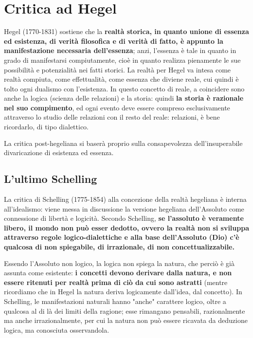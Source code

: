 \chapter{Critica ad Hegel}
\bigskip


Hegel (1770-1831) sostiene che la \textbf{realtà storica, in quanto unione di essenza ed esistenza, di verità filosofica e di verità di fatto, è appunto la manifestazione necessaria dell'essenza}; anzi, l'essenza è tale in quanto in grado di manifestarsi compiutamente, cioè in quanto realizza pienamente le sue possibilità e potenzialità nei fatti storici. La realtà per Hegel va intesa come realtà compiuta, come effettualità, come essenza che diviene reale, cui quindi è tolto ogni dualismo con l'esistenza. In questo concetto di reale, a coincidere sono anche la logica (scienza delle relazioni) e la storia: quindi \textbf{la storia è razionale nel suo compimento}, ed ogni evento deve essere compreso esclusivamente attraverso lo studio delle relazioni con il resto del reale: relazioni, è bene ricordarlo,  di tipo dialettico.

La critica post-hegeliana si baserà proprio sulla consapevolezza dell'insuperabile divaricazione di esistenza ed essenza.

\section{L'ultimo Schelling}

La critica di Schelling (1775-1854) alla concezione della realtà hegeliana è interna all'idealismo: viene messa in discussione la versione hegeliana dell'Assoluto come connessione di libertà e logicità. Secondo Schelling, \textbf{se l'assoluto è veramente libero, il mondo non può esser dedotto, ovvero la realtà non si sviluppa attraverso regole logico-dialettiche  e alla base dell'Assoluto (Dio) c'è qualcosa di non spiegabile, di irrazionale, di non concettualizzabile.}

Essendo l'Assoluto non logico, la logica non spiega la natura, che perciò è già assunta come esistente: \textbf{i concetti devono derivare dalla natura, e non essere ritenuti per realtà prima di ciò da cui sono astratti} (mentre ricordiamo che in Hegel la natura deriva logicamente dall'idea, dal concetto). In Schelling, le manifestazioni naturali hanno "anche" carattere logico, oltre a qualcosa al di là dei limiti della ragione; esse rimangano pensabili, razionalmente ma anche irrazionalmente, per cui la natura non può essere ricavata da deduzione logica, ma conosciuta osservandola.


